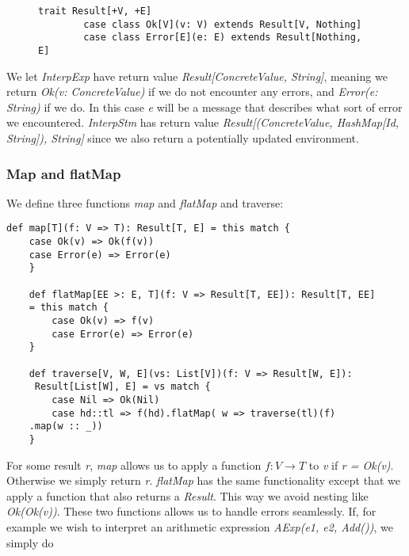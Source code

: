\begin{figure}[!h]
	\begin{lstlisting}[style=simple]
		trait Result[+V, +E]
		case class Ok[V](v: V) extends Result[V, Nothing]
		case class Error[E](e: E) extends Result[Nothing, E]
	\end{lstlisting}
\end{figure}

We let \textsl{InterpExp} have return value \textsl{Result[ConcreteValue, String]}, meaning we return \textsl{Ok(v: ConcreteValue)} if we do not encounter any errors, and \textsl{Error(e: String)} if we do. In this case \textsl{e} will be a message that describes what sort of error we encountered. \textsl{InterpStm} has return value 
 \textsl{Result[(ConcreteValue, HashMap[Id, String]), String]} since we also return a potentially updated environment. 

\subsubsection{Map and flatMap}

We define three functions \textsl{map} and \textsl{flatMap} and traverse:

\begin{lstlisting}[style=simple]
	def map[T](f: V => T): Result[T, E] = this match {
	case Ok(v) => Ok(f(v))
	case Error(e) => Error(e)
	}
	
	def flatMap[EE >: E, T](f: V => Result[T, EE]): Result[T, EE] 
	= this match {
		case Ok(v) => f(v)
		case Error(e) => Error(e)
	}
	
	def traverse[V, W, E](vs: List[V])(f: V => Result[W, E]):
	 Result[List[W], E] = vs match {
		case Nil => Ok(Nil)
		case hd::tl => f(hd).flatMap( w => traverse(tl)(f)
	.map(w :: _))
	}
\end{lstlisting}
For some result \textsl{r}, \textsl{map} allows us to apply a function $f: V \rightarrow T$ to \textsl{v} if \textsl{r = Ok(v)}. Otherwise we simply return \textsl{r}. \textsl{flatMap} has the same functionality except that we apply a function that also returns a \textsl{Result}. This way we avoid nesting like \textsl{Ok(Ok(v))}. These two functions allows us to handle errors seamlessly. If, for example we wish to interpret an arithmetic expression \textsl{AExp(e1, e2, Add())}, we simply do 

